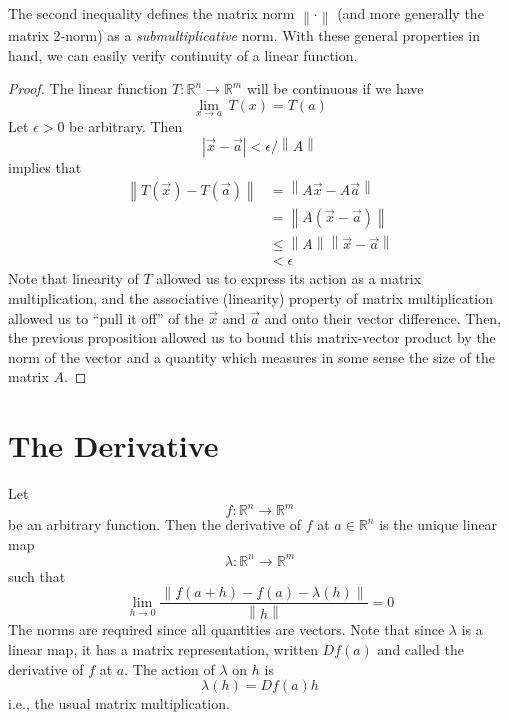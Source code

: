 The second inequality defines the matrix norm $\left\lVert \cdot \right\rVert$ (and more generally the matrix 2-norm) as a \textit{submultiplicative} norm. With these general properties in hand, we can easily verify continuity of a linear function.

\begin{proof}
The linear function $T:\mathbb{R}^n \rightarrow \mathbb{R}^m$ will be continuous if we have \[ \lim_{x\rightarrow a}\, T\left(x\right) = T\left(a\right) \] Let $\epsilon >0 $ be arbitrary. Then \[ \left\lvert \vec{x} - \vec{a} \right\rvert < \epsilon / \left\lVert A \right\rVert  \] implies that
\begin{align*}
\left\lVert T\left(\vec{x}\right) - T\left(\vec{a}\right) \right\rVert & = \left\lVert A\vec{x} - A\vec{a} \right\rVert \\ 
& = \left\lVert A\left(\vec{x} - \vec{a}\right) \right\rVert \\ 
& \leq \left\lVert A \right\rVert \left\lVert \vec{x} - \vec{a} \right\rVert \\
& < \epsilon
\end{align*}
Note that linearity of $T$ allowed us to express its action as a matrix multiplication, and the associative (linearity) property of matrix multiplication allowed us to ``pull it off'' of the $\vec{x}$ and $\vec{a}$ and onto their vector difference. Then, the previous proposition allowed us to bound this matrix-vector product by the norm of the vector and a quantity which measures in some sense the size of the matrix $A$.
\end{proof}




















\chapter{The Derivative}

Let \[ f:\mathbb{R}^n \rightarrow \mathbb{R}^m \] be an arbitrary function. Then the derivative of $f$ at $a \in \mathbb{R}^n$ is the unique linear map \[ \lambda: \mathbb{R}^n \rightarrow \mathbb{R}^m \] such that
\[ \lim_{h\rightarrow 0} \frac{\left\lVert f\left(a+h\right) - f\left(a\right) - \lambda\left( h\right)  \right\rVert }{\left\lVert h \right\rVert } =0 \] The norms are required since all quantities are vectors. Note that since $\lambda$ is a linear map, it has a matrix representation, written $Df\left(a\right)$ and called the derivative of $f$ at $a$. The action of $\lambda $ on $h$ is \[ \lambda\left(h\right) = Df\left(a\right) h \] i.e., the usual matrix multiplication.

